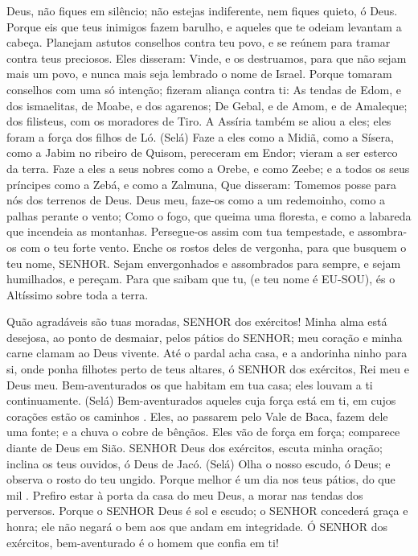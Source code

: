 {\PP 
  Deus, não fiques em silêncio; não estejas indiferente, nem fiques quieto, ó Deus.
  Porque eis que teus inimigos fazem barulho, e aqueles que te odeiam levantam a cabeça.
  Planejam astutos conselhos contra teu povo, e se reúnem para tramar contra teus preciosos.
  Eles disseram: Vinde, e os destruamos, para que não sejam mais um povo, e nunca mais seja lembrado o nome de Israel.
  Porque tomaram conselhos com uma só intenção; fizeram aliança contra ti:
  As tendas de Edom, e dos ismaelitas, de Moabe, e dos agarenos;
  De Gebal, e de Amom, e de Amaleque; dos filisteus, com os moradores de Tiro.
  A Assíria também se aliou a eles; eles foram a força dos filhos de Ló. (Selá)
  Faze a eles como a Midiã, como a Sísera, como a Jabim no ribeiro de Quisom,
   pereceram em Endor; vieram a ser esterco da terra.
  Faze a eles
{} a seus nobres como a Orebe, e como Zeebe; e a todos os seus príncipes como a Zebá, e como a Zalmuna,
  Que disseram: Tomemos posse para nós dos terrenos de Deus.
  Deus meu, faze-os como a um redemoinho, como a palhas perante o vento;
  Como o fogo, que queima uma floresta, e como a labareda que incendeia as montanhas.
  Persegue-os assim com tua tempestade, e assombra-os com o teu forte vento.
  Enche os rostos deles de vergonha, para que busquem o teu nome, SENHOR.
  Sejam envergonhados e assombrados para sempre, e sejam humilhados, e pereçam.
  Para que saibam que tu, (e teu nome é EU-SOU), és o Altíssimo sobre toda a terra.
\par }


{\PP 
  Quão agradáveis são tuas moradas, SENHOR dos exércitos!
  Minha alma está desejosa, ao ponto de desmaiar, pelos pátios do SENHOR; meu coração e minha carne clamam ao Deus vivente.
  Até o pardal acha casa, e a andorinha ninho para si, onde ponha filhotes perto de teus altares, ó SENHOR dos exércitos, Rei meu e Deus meu.
  Bem-aventurados os que habitam em tua casa; eles louvam a ti continuamente. (Selá)
  Bem-aventurados aqueles cuja força está em ti, em cujos corações estão os caminhos
{} .
  Eles, ao passarem pelo Vale de Baca, fazem dele uma fonte; e a chuva o cobre de bênçãos.
  Eles vão de força em força;
{} comparece diante de Deus em Sião.
  SENHOR Deus dos exércitos, escuta minha oração; inclina os teus ouvidos, ó Deus de Jacó. (Selá)
  Olha o nosso escudo, ó Deus; e observa o rosto do teu ungido.
  Porque melhor é um dia nos teus pátios, do que mil
{} . Prefiro estar à porta da casa do meu Deus, a morar nas tendas dos perversos.
  Porque o SENHOR Deus é sol e escudo; o SENHOR concederá graça e honra; ele não negará o bem aos que andam em integridade.
  Ó SENHOR dos exércitos, bem-aventurado é o homem que confia em ti!
\par }

